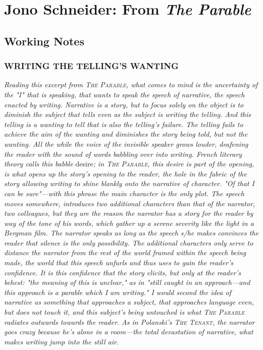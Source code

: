 \documentclass[
]{memoir}
\begin{document}
\hypertarget{jono-schneider-from-the-parable}{%
\chapter{\texorpdfstring{Jono Schneider: From \emph{The
Parable}}{Jono Schneider: From The Parable}}\label{jono-schneider-from-the-parable}}

\hypertarget{working-notes-6}{%
\section*{Working Notes}\label{working-notes-6}}

\hypertarget{writing-the-tellings-wanting}{%
\subsection*{WRITING THE TELLING'S
WANTING}\label{writing-the-tellings-wanting}}

\emph{Reading this excerpt from \textsc{The Parable}, what comes to mind
is the uncertainty of the "I" that is speaking, that wants to speak the
speech of narrative, the speech enacted by writing. Narrative is a
story, but to focus solely on the object is to diminish the subject that
tells even as the subject is writing the telling. And this telling is a
wanting to tell that is also the telling's failure. The telling fails to
achieve the aim of the wanting and diminishes the story being told, but
not the wanting. All the while the voice of the invisible speaker grows
louder, deafening the reader with the sound of words babbling over into
writing. French literary theory calls this babble} desire\emph{; in
\textsc{The Parable}, this desire is part of the opening, is what opens
up the story's opening to the reader, the hole in the fabric of the
story allowing writing to shine blankly onto the narrative of character.
"Of that I can be sure"---with this phrase the main character is the
only plot. The speech moves somewhere, introduces two additional
characters than that of the narrator, two colleagues, but they are the
reason the narrator has a story for the reader by way of the tone of his
words, which gather up a serene severity like the light in a Bergman
film. The narrator speaks as long as the speech s/he makes convinces the
reader that silence is the only possibility. The additional characters
only serve to distance the narrator from the rest of the world framed
within the speech being made, the world that this speech unfurls and
thus uses to gain the reader's confidence. It is this confidence that
the story elicits, but only at the reader's behest: "the meaning of this
is unclear," as in "still caught in an approach---and this approach is a
parable which I am writing." I would second the idea of narrative as
something that approaches a subject, that approaches language even, but
does not touch it, and this subject's being untouched is what
\textsc{The Parable} radiates outwards towards the reader. As in
Polanski's \textsc{The Tenant}, the narrator goes crazy because he's
alone in a room---the total devastation of narrative, what makes writing
jump into the still air.}
\end{document}
